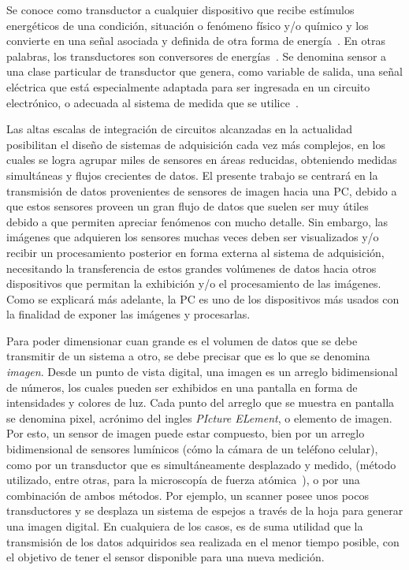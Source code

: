 Se conoce como transductor a cualquier dispositivo que recibe estímulos energéticos de una condición, situación o fenómeno físico y/o químico y los convierte en una señal asociada y definida de otra forma de energía~\cite{Pallas-Areny2001,considine1971encyclopedia}. En otras palabras, los transductores son conversores de energías~\cite{Pallas-Areny2001,considine1971encyclopedia,PerezGarcia2008}. Se denomina sensor a una clase particular de transductor que genera, como variable de salida, una señal eléctrica que está especialmente adaptada para ser ingresada en un circuito electrónico, o adecuada al sistema de medida que se utilice~\cite{Fraden2010,Slawinski2011,Ogata2002}.%

Las altas escalas de integración de circuitos alcanzadas en la actualidad posibilitan el diseño de sistemas de adquisición cada vez más complejos, en los cuales se logra agrupar miles de sensores en áreas reducidas, obteniendo medidas simultáneas y flujos crecientes de datos. El presente trabajo se centrará en la transmisión de datos provenientes de sensores de imagen hacia una PC, debido a que estos sensores proveen un gran flujo de datos que suelen ser muy útiles debido a que permiten apreciar fenómenos con mucho detalle. Sin embargo, las imágenes que adquieren los sensores muchas veces deben ser visualizados y/o recibir un procesamiento posterior en forma externa al sistema de adquisición, necesitando la transferencia de estos grandes volúmenes de datos hacia otros dispositivos que permitan la exhibición y/o el procesamiento de las imágenes. Como se explicará más adelante, la PC es uno de los dispositivos más usados con la finalidad de exponer las imágenes y procesarlas.%

Para poder dimensionar cuan grande es el volumen de datos que se debe transmitir de un sistema a otro, se debe precisar que es lo que se denomina \textit{imagen}. Desde un punto de vista digital, una imagen es un arreglo bidimensional de números, los cuales pueden ser exhibidos en una pantalla en forma de intensidades y colores de luz. Cada punto del arreglo que se muestra en pantalla se denomina pixel, acrónimo del ingles {\it PIcture ELement}, o elemento de imagen. Por esto, un sensor de imagen puede estar compuesto, bien por un arreglo bidimensional de sensores lumínicos (cómo la cámara de un teléfono celular), como por un transductor que es simultáneamente desplazado y medido, (método utilizado, entre otras, para la microscopía de fuerza atómica~\cite{Binnig1983}), o por una combinación de ambos métodos. Por ejemplo, un scanner posee unos pocos transductores y se desplaza un sistema de espejos a través de la hoja para generar una imagen digital. En cualquiera de los casos, es de suma utilidad que la transmisión de los datos adquiridos sea realizada en el menor tiempo posible, con el objetivo de tener el sensor disponible para una nueva medición.

